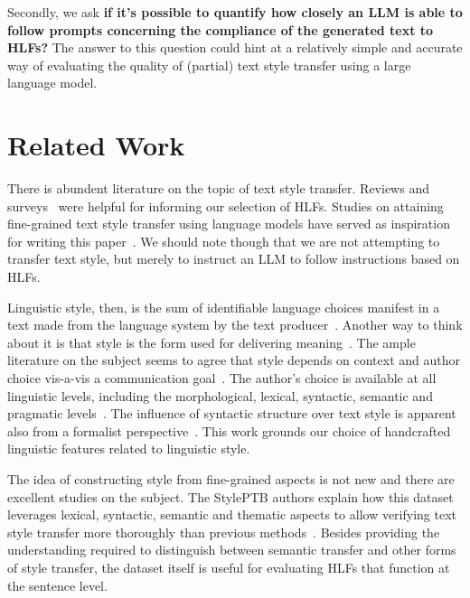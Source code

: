 \documentclass[runningheads,a4paper,11pt]{article}
\begin{document}
Secondly, we ask \textbf{if it's possible to quantify how closely an LLM is able
    to follow prompts concerning the compliance of the generated text to HLFs?}
The answer to this question could hint at a relatively simple and accurate way
of evaluating the quality of (partial) text style transfer using a large
language model.


\section{Related Work}\label{related}

There is abundent literature on the topic of text style transfer.
Reviews and surveys~\cite{tst-review-2021,tst-survey-2022} were helpful for
informing our selection of HLFs.
Studies on attaining fine-grained text style transfer using language models
have served as inspiration for writing this paper~\cite{lyu-etal-2023-fine}.
We should note though that we are not attempting to transfer text style, but
merely to instruct an LLM to follow instructions based on HLFs.

Linguistic style, then, is the sum of identifiable language choices manifest in
a text made from the language system by the text
producer~\cite{lugea2023stylistics}.
Another way to think about it is that style is the form used for delivering
meaning~\cite{tst_sigkdd_review_2022}.
The ample literature on the subject seems to agree that style depends on context
and author choice vis-a-vis a communication
goal~\cite{mcdonald1985computational,hovy1987generating}.
The author's choice is available at all linguistic levels, including the
morphological, lexical, syntactic, semantic and pragmatic
levels~\cite{dimarco1994model,lugea2023stylistics}.
The influence of syntactic structure over text style is apparent also from a
formalist perspective~\cite{chomsky2002syntactic}.
This work grounds our choice of handcrafted linguistic features related to
linguistic style.

The idea of constructing style from fine-grained aspects is not new and there
are excellent studies on the subject.
The StylePTB authors explain how this dataset leverages lexical, syntactic,
semantic and thematic aspects to allow verifying text style transfer more
thoroughly than previous methods~\cite{lyu-etal-2021-styleptb}.
Besides providing the understanding required to distinguish between semantic
transfer and other forms of style transfer, the dataset itself is useful for
evaluating HLFs that function at the sentence level.
\end{document}
